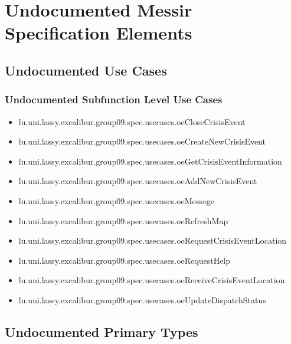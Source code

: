 	
\chapter{Undocumented Messir Specification Elements}


\section[Undocumented Use Cases]{Undocumented Use Cases}



\subsection[Undocumented Use Cases - Subfunction Level]{Undocumented Subfunction Level Use Cases}
\begin{itemize}
\item lu.uni.lassy.excalibur.group09.spec.usecases.oeCloseCrisisEvent 
\item lu.uni.lassy.excalibur.group09.spec.usecases.oeCreateNewCrisisEvent 
\item lu.uni.lassy.excalibur.group09.spec.usecases.oeGetCrisisEventInformation 
\item lu.uni.lassy.excalibur.group09.spec.usecases.oeAddNewCrisisEvent 
\item lu.uni.lassy.excalibur.group09.spec.usecases.oeMessage 
\item lu.uni.lassy.excalibur.group09.spec.usecases.oeRefreshMap 
\item lu.uni.lassy.excalibur.group09.spec.usecases.oeRequestCrisisEventLocation 
\item lu.uni.lassy.excalibur.group09.spec.usecases.oeRequestHelp 
\item lu.uni.lassy.excalibur.group09.spec.usecases.oeReceiveCrisisEventLocation 
\item lu.uni.lassy.excalibur.group09.spec.usecases.oeUpdateDispatchStatus 
\end{itemize}











\section[Undocumented Primary Types]{Undocumented Primary Types}



